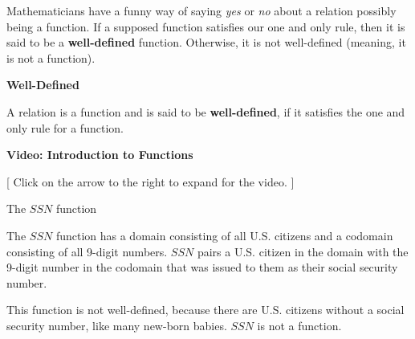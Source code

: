 \documentclass{ximera}
\begin{document}
Mathematicians have a funny way of saying \textit{yes} or \textit{no} about a relation possibly being a function. If a supposed function satisfies our one and only rule, then it is said to be a \textbf{well-defined} function.  Otherwise, it is not well-defined (meaning, it is not a function).




\begin{definition} \textbf{\textcolor{green!50!black}{Well-Defined}}

A relation is a function and is said to be \textbf{well-defined}, if it satisfies the one and only rule for a function.
\end{definition}













\begin{onlineOnly}
\begin{explanation} \textbf{\textcolor{red!75!green}{Video: Introduction to Functions}} 

[ Click on the arrow to the right to expand for the video. ]
\begin{expandable} 

\begin{center}
\end{center}

\end{expandable}

\end{explanation}
\end{onlineOnly}






\begin{example} The $SSN$ function

The $SSN$ function has a domain consisting of all U.S. citizens and a codomain consisting of all 9-digit numbers.  $SSN$ pairs a U.S. citizen in the domain with the 9-digit number in the codomain that was issued to them as their social security number. 


This function is not well-defined, because there are U.S. citizens without a social security number, like many new-born babies.   $SSN$ is not a function.
\end{example}
\end{document}
